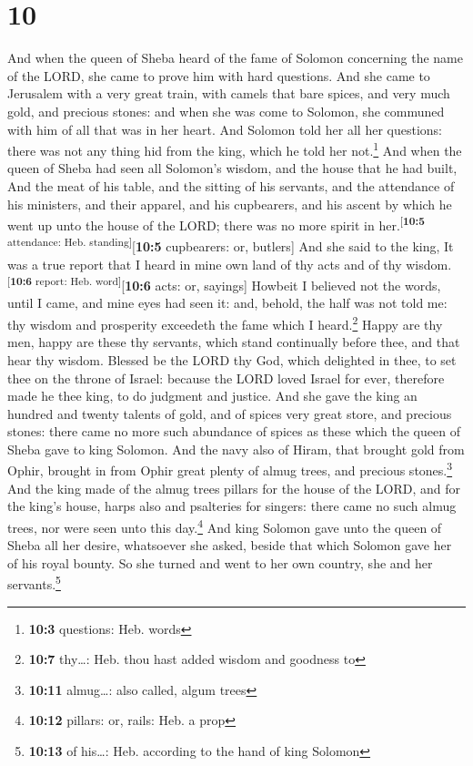 \hypertarget{section-9}{%
\section{10}\label{section-9}}

 And when the queen of Sheba heard of the fame of Solomon
concerning the name of the LORD, she came to prove him with hard
questions.  And she came to Jerusalem with a very great
train, with camels that bare spices, and very much gold, and precious
stones: and when she was come to Solomon, she communed with him of all
that was in her heart.  And Solomon told her all her
questions: there was not any thing hid from the king, which he told her
not.\footnote{\textbf{10:3} questions: Heb. words}  And
when the queen of Sheba had seen all Solomon's wisdom, and the house
that he had built,  And the meat of his table, and the
sitting of his servants, and the attendance of his ministers, and their
apparel, and his cupbearers, and his ascent by which he went up unto the
house of the LORD; there was no more spirit in
her.\textsuperscript{{[}\textbf{10:5} attendance: Heb.
standing{]}}{[}\textbf{10:5} cupbearers: or, butlers{]} 
And she said to the king, It was a true report that I heard in mine own
land of thy acts and of thy wisdom.\textsuperscript{{[}\textbf{10:6}
report: Heb. word{]}}{[}\textbf{10:6} acts: or, sayings{]}
 Howbeit I believed not the words, until I came, and mine
eyes had seen it: and, behold, the half was not told me: thy wisdom and
prosperity exceedeth the fame which I heard.\footnote{\textbf{10:7}
  thy\ldots: Heb. thou hast added wisdom and goodness to} 
Happy are thy men, happy are these thy servants, which stand continually
before thee, and that hear thy wisdom.  Blessed be the
LORD thy God, which delighted in thee, to set thee on the throne of
Israel: because the LORD loved Israel for ever, therefore made he thee
king, to do judgment and justice.  And she gave the king
an hundred and twenty talents of gold, and of spices very great store,
and precious stones: there came no more such abundance of spices as
these which the queen of Sheba gave to king Solomon.  And
the navy also of Hiram, that brought gold from Ophir, brought in from
Ophir great plenty of almug trees, and precious stones.\footnote{\textbf{10:11}
  almug\ldots: also called, algum trees}  And the king
made of the almug trees pillars for the house of the LORD, and for the
king's house, harps also and psalteries for singers: there came no such
almug trees, nor were seen unto this day.\footnote{\textbf{10:12}
  pillars: or, rails: Heb. a prop}  And king Solomon gave
unto the queen of Sheba all her desire, whatsoever she asked, beside
that which Solomon gave her of his royal bounty. So she turned and went
to her own country, she and her servants.\footnote{\textbf{10:13} of
  his\ldots: Heb. according to the hand of king Solomon}

